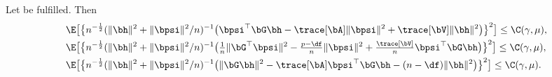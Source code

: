 \documentclass{colt2022} %
\numberwithin{equation}{section}
\begin{document}
\begin{proposition}
    \label{prop:first-three-equations}
    Let  be fulfilled.
    Then
    \begin{align}
        \label{eq:five-1}
        \E 
        \bigl[
            \bigl\{
            n^{-\frac12} 
            (\|\bh\|^2 + \|\bpsi\|^2/n)^{-1}&
            \bigl(
                \bpsi^{\top} \bG \bh  
                - \trace [ \bA ] \| \bpsi \|^{2} 
                + \trace [ \bV ] \| \bh \|^{2} 
            \bigr)
            \bigr\}^{2} 
        \bigr]
        \le\C(\gamma,\mu)
        ,
        \\
        \E
        \bigl[
            \bigl\{
            n^{-\frac12} 
            (\|\bh\|^2 + \|\bpsi\|^2/n)^{-1}&
            \bigl(
                \tfrac 1 n \|\bG^{\top} \bpsi\| ^{2}
                - \tfrac{p - 
                \df}{n}
                \| \bpsi \|^{2} 
                +
                \tfrac{\trace [ \bV ]}{n} \bpsi^{\top} \bG \bh
            \bigr)
            \bigr\}^{2}
        \bigr]
        \le\C(\gamma,\mu),
        \label{eq:five-2}
        \\
        \label{eq:five-3}
        \E \bigl[
            \bigl\{
            n^{-\frac12} 
            (\|\bh\|^2 + \|\bpsi\|^2/n)^{-1}&
            \bigl(
                \| \bG \bh \|^{2}
                 - 
                 \trace [ \bA ] \bpsi^{\top} \bG \bh 
                 - 
                 ( n - \df ) \| \bh \|^{2}
            \bigr)
            \bigr\}^{2}
        \bigr]
        \le\C(\gamma,\mu).
    \end{align}
\end{proposition}
\end{document}
